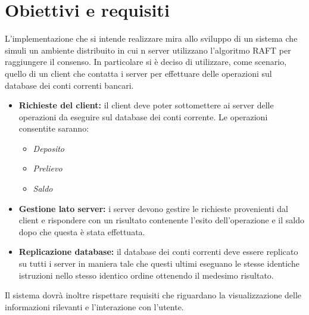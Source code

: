 \section{Obiettivi e requisiti}
	L'implementazione che si intende realizzare mira allo sviluppo di un sistema che simuli un ambiente distribuito in cui n server utilizzano l'algoritmo RAFT per raggiungere il consenso. In particolare si è deciso di utilizzare, come scenario, quello di un client che contatta i server per effettuare delle operazioni sul database dei conti correnti bancari.
	\begin{itemize}
			\item \textbf{Richieste del client:} il client deve poter sottomettere ai server delle operazioni da eseguire sul database dei conti corrente. Le operazioni consentite saranno:
				\begin{itemize}
					\item \emph{Deposito}
					\item \emph{Prelievo}
					\item \emph{Saldo}
				\end{itemize}
			\item \textbf{Gestione lato server:} i server devono gestire le richieste provenienti dal client e rispondere con un risultato contenente l'esito dell'operazione e il saldo dopo che questa è stata effettuata.
			\item \textbf{Replicazione database:} il database dei conti correnti deve essere replicato su tutti i server in maniera tale che questi ultimi eseguano le stesse identiche istruzioni nello stesso identico ordine ottenendo il medesimo risultato.
		\end{itemize}

	Il sistema dovrà inoltre rispettare requisiti che riguardano la visualizzazione delle informazioni rilevanti e l'interazione con l'utente.


